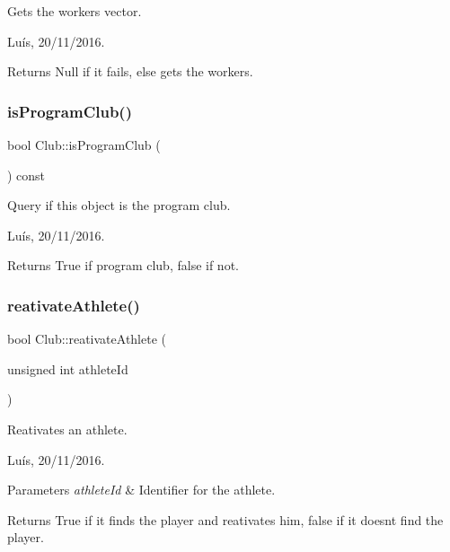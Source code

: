 Gets the workers\textquotesingle{} vector. 

Luís, 20/11/2016. 

\begin{DoxyReturn}{Returns}
Null if it fails, else gets the workers. 
\end{DoxyReturn}
\hypertarget{class_club_a4c867a8b3743c99fa57131709be0172a}{}\label{class_club_a4c867a8b3743c99fa57131709be0172a} 
\subsubsection{\texorpdfstring{is\+Program\+Club()}{isProgramClub()}}
{\footnotesize\ttfamily bool Club\+::is\+Program\+Club (\begin{DoxyParamCaption}{ }\end{DoxyParamCaption}) const}



Query if this object is the program club. 

Luís, 20/11/2016. 

\begin{DoxyReturn}{Returns}
True if program club, false if not. 
\end{DoxyReturn}
\hypertarget{class_club_a2ecfd114e812c310d6155d111b500d6c}{}\label{class_club_a2ecfd114e812c310d6155d111b500d6c} 
\subsubsection{\texorpdfstring{reativate\+Athlete()}{reativateAthlete()}}
{\footnotesize\ttfamily bool Club\+::reativate\+Athlete (\begin{DoxyParamCaption}\item[{unsigned int}]{athlete\+Id }\end{DoxyParamCaption})}



Reativates an athlete. 

Luís, 20/11/2016. 


\begin{DoxyParams}{Parameters}
{\em athlete\+Id} & Identifier for the athlete. \\
\hline
\end{DoxyParams}


\begin{DoxyReturn}{Returns}
True if it finds the player and reativates him, false if it doesn\textquotesingle{}t find the player. 
\end{DoxyReturn}
\hypertarget{class_club_a91ea60cae983d86c47e492aa77e59147}{}\label{class_club_a91ea60cae983d86c47e492aa77e59147} 
